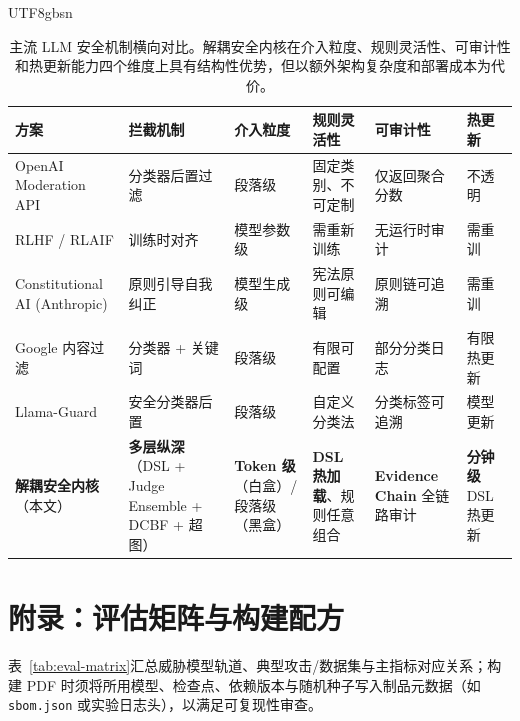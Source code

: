 \documentclass[letterpaper,twocolumn,10pt]{article}
\begin{document}
\begin{CJK}{UTF8}{gbsn}
\begin{table}[t]
\centering
\small
\setlength{\tabcolsep}{3pt}
\begin{tabular}{@{}p{2.8cm}p{2.4cm}p{2.2cm}p{2.2cm}p{2.0cm}p{2.0cm}@{}}
\toprule
\textbf{方案} & \textbf{拦截机制} & \textbf{介入粒度} & \textbf{规则灵活性} & \textbf{可审计性} & \textbf{热更新} \\
\midrule
OpenAI Moderation API & 分类器后置过滤 & 段落级 & 固定类别、不可定制 & 仅返回聚合分数 & 不透明 \\
RLHF / RLAIF & 训练时对齐 & 模型参数级 & 需重新训练 & 无运行时审计 & 需重训 \\
Constitutional AI (Anthropic) & 原则引导自我纠正 & 模型生成级 & 宪法原则可编辑 & 原则链可追溯 & 需重训 \\
Google 内容过滤 & 分类器 + 关键词 & 段落级 & 有限可配置 & 部分分类日志 & 有限热更新 \\
Llama-Guard & 安全分类器后置 & 段落级 & 自定义分类法 & 分类标签可追溯 & 模型更新 \\
\textbf{解耦安全内核}（本文） & \textbf{多层纵深}（DSL + Judge Ensemble + DCBF + 超图） & \textbf{Token 级}（白盒）/ 段落级（黑盒） & \textbf{DSL 热加载}、规则任意组合 & \textbf{Evidence Chain} 全链路审计 & \textbf{分钟级} DSL 热更新 \\
\bottomrule
\end{tabular}
\caption{主流 LLM 安全机制横向对比。解耦安全内核在介入粒度、规则灵活性、可审计性和热更新能力四个维度上具有结构性优势，但以额外架构复杂度和部署成本为代价。}
\label{tab:safety-comparison}
\end{table}

\section{附录：评估矩阵与构建配方}
\label{sec:appendix-eval}

表~\ref{tab:eval-matrix}汇总威胁模型轨道、典型攻击/数据集与主指标对应关系；构建 PDF 时须将所用模型、检查点、依赖版本与随机种子写入制品元数据（如 \texttt{sbom.json} 或实验日志头），以满足可复现性审查。


\end{CJK}
\end{document}
